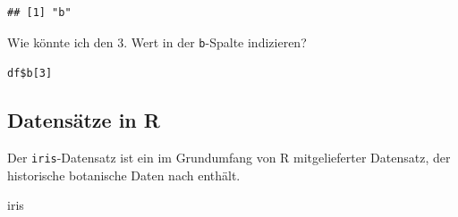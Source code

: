 \documentclass[
]{book}
\newenvironment{Shaded}{\begin{snugshade}}{\end{snugshade}}
\newcommand{\NormalTok}[1]{#1}
\begin{document}
\begin{verbatim}
## [1] "b"
\end{verbatim}

Wie könnte ich den 3. Wert in der \texttt{b}-Spalte indizieren?

\texttt{df\$b{[}3{]}}

\hypertarget{datensuxe4tze-in-r-2}{%
\subsection{Datensätze in R}\label{datensuxe4tze-in-r-2}}

Der \texttt{iris}-Datensatz ist ein im Grundumfang von R mitgelieferter Datensatz, der historische botanische Daten nach \citet{andersonIrisesGaspePeninsula1935} enthält.

\begin{Shaded}
\begin{Highlighting}[]
\NormalTok{iris}
\end{Highlighting}
\end{Shaded}
\end{document}
